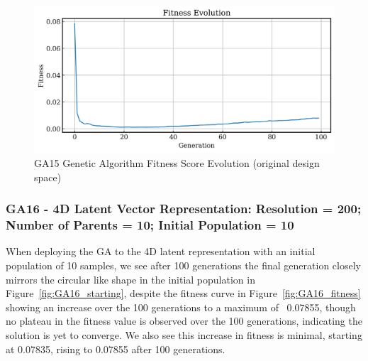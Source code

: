 \documentclass{article}
\begin{document}
\begin{figure}[H]
    \centering
    \includegraphics[width=0.75\linewidth]{figures/GAResults/GA15/original/original_fitness.png}
    \caption{GA15 Genetic Algorithm Fitness Score Evolution (original design space)}
    \label{fig:GA15_fitness}
\end{figure}

\subsubsection*{GA16 - 4D Latent Vector Representation: Resolution = 200; Number of Parents = 10; Initial Population = 10}

When deploying the GA to the 4D latent representation with an initial population of 10 samples, we see after 100 generations the final generation closely mirrors the circular like shape in the initial population in Figure~\ref{fig:GA16_starting}, despite the fitness curve in Figure~\ref{fig:GA16_fitness} showing an increase over the 100 generations to a maximum of ~0.07855, though no plateau in the fitness value is observed over the 100 generations, indicating the solution is yet to converge. We also see this increase in fitness is minimal, starting at 0.07835, rising to 0.07855 after 100 generations.
\end{document}
